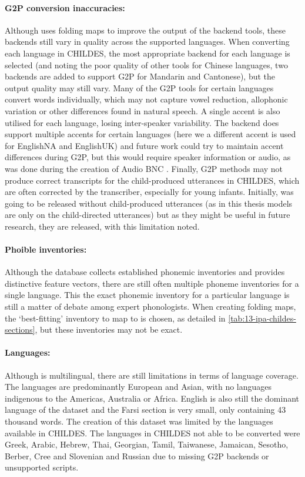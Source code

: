 \paragraph{G2P conversion inaccuracies:} Although \gpp uses folding maps to improve the output of the backend tools, these backends still vary in quality across the supported languages. When converting each language in CHILDES, the most appropriate backend for each language is selected (and noting the poor quality of other tools for Chinese languages, two backends are added to support G2P for Mandarin and Cantonese), but the output quality may still vary. Many of the G2P tools for certain languages convert words individually, which may not capture vowel reduction, allophonic variation or other differences found in natural speech. A single accent is also utilised for each language, losing inter-speaker variability. The \phonemizer backend does support multiple accents for certain languages (here we a different accent is used for EnglishNA and EnglishUK) and future work could try to maintain accent differences during G2P, but this would require speaker information or audio, as was done during the creation of Audio BNC \citep{coleman2012audio}. Finally, G2P methods may not produce correct transcripts for the child-produced utterances in CHILDES, which are often corrected by the transcriber, especially for young infants. Initially, \ipachildes was going to be released without child-produced utterances (as in this thesis models are only on the child-directed utterances) but as they might be useful in future research, they are released, with this limitation noted.

\paragraph{Phoible inventories:} Although the \phoible database collects established phonemic inventories and provides distinctive feature vectors, there are still often multiple phoneme inventories for a single language. This the exact phonemic inventory for a particular language is still a matter of debate among expert phonologists. When creating folding maps, the `best-fitting' inventory to map to is chosen, as detailed in \cref{tab:13-ipa-childes-sections}, but these inventories may not be exact.

\paragraph{Languages:} Although \ipachildes is multilingual, there are still limitations in terms of language coverage. The languages are predominantly European and Asian, with no languages indigenous to the Americas, Australia or Africa. English is also still the dominant language of the dataset and the Farsi section is very small, only containing 43 thousand words. The creation of this dataset was limited by the languages available in CHILDES. The languages in CHILDES not able to be converted were Greek, Arabic, Hebrew, Thai, Georgian, Tamil, Taiwanese, Jamaican, Sesotho, Berber, Cree and Slovenian and Russian due to missing G2P backends or unsupported scripts.


